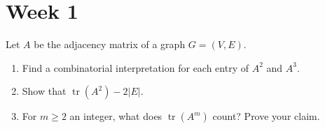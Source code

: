 \documentclass[11pt, a4paper]{ctexrep}
\begin{document}
\section{Week 1}

\begin{exercise}
    Let $A$ be the adjacency matrix of a graph $G=(V, E)$.
    \begin{enumerate}
        \item[(a)] Find a combinatorial interpretation for each entry of $A^2$ and $A^3$.
        \item[(b)] Show that $\operatorname{tr}\left(A^2\right)-2|E|$.
        \item[(c)] For $m \geq 2$ an integer, what does $\operatorname{tr}\left(A^m\right)$ count? Prove your claim.
    \end{enumerate}
\end{exercise}
\end{document}
